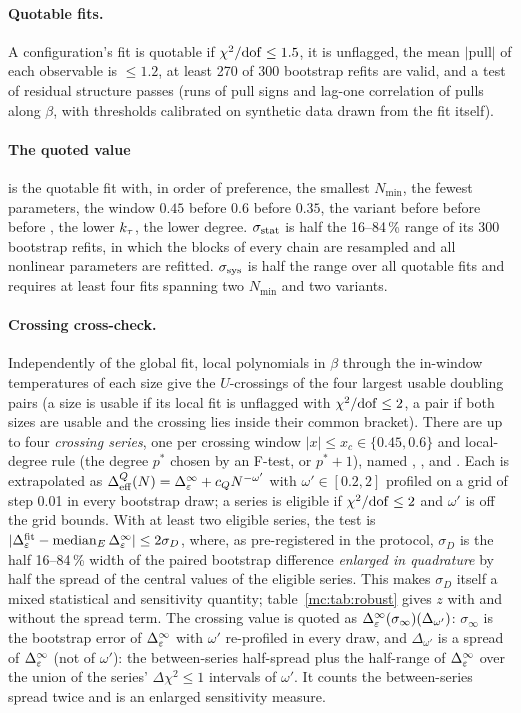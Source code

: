 \paragraph{Quotable fits.} A configuration's fit is quotable if $\chi^2/{\rm dof}\le1.5$, it is unflagged, the mean $|$pull$|$ of each observable is
$\le1.2$, at least 270 of 300 bootstrap refits are valid, and a test of residual structure passes (runs of pull signs and lag-one correlation
of pulls along $\beta$, with thresholds calibrated on synthetic data drawn from the fit itself).

\paragraph{The quoted value} is the quotable fit with, in order of preference, the smallest $N_{\min}$, the fewest parameters, the window
$0.45$ before $0.6$ before $0.35$, the variant  before  before  before , the lower $k_\tau$,
the lower degree. $\sigma_{\rm stat}$ is half the 16--84\,\% range of its 300 bootstrap refits, in which the blocks of every chain are resampled and all nonlinear
parameters are refitted. $\sigma_{\rm sys}$ is
half the range over all quotable fits and requires at least four fits spanning two $N_{\min}$ and two variants.

\paragraph{Crossing cross-check.} Independently of the global fit, local polynomials in $\beta$ through the in-window temperatures of each size
give the $U$-crossings of the four largest usable doubling pairs (a size is usable if its local fit is unflagged with $\chi^2/{\rm dof}\le2$,
a pair if both sizes are usable and the crossing lies inside their common bracket). There are up to four \emph{crossing series}, one per
crossing window $|x|\le x_c\in\{0.45,0.6\}$ and local-degree rule (the degree $p^*$ chosen by an F-test, or $p^*+1$), named
, ,  and . Each is extrapolated as $\Delta_{\rm eff}^Q(N)=\Delta_\varepsilon^\infty+c_QN^{-\omega'}$ with $\omega'\in[0.2,2]$ profiled on a grid of step 0.01 in every
bootstrap draw; a series is eligible if $\chi^2/{\rm dof}\le2$ and $\omega'$ is off the grid bounds. With at least two eligible series, the test
is $|\Delta_\varepsilon^{\rm fit}-{\rm median}_E\,\Delta_\varepsilon^\infty|\le2\sigma_D$, where, as pre-registered in the protocol, $\sigma_D$ is the half 16--84\,\% width of
the paired bootstrap difference \emph{enlarged in quadrature} by half the spread of the central values of the eligible series. This makes
$\sigma_D$ itself a mixed statistical and sensitivity quantity; table~\ref{mc:tab:robust} gives $z$ with and without the spread term. The crossing
value is quoted as $\Delta_\varepsilon^\infty(\sigma_\infty)(\Delta_{\omega'})$: $\sigma_\infty$ is the bootstrap error of $\Delta_\varepsilon^\infty$ with $\omega'$
re-profiled in every draw, and $\Delta_{\omega'}$ is a spread of $\Delta_\varepsilon^\infty$ (not of $\omega'$): the between-series half-spread plus the
half-range of $\Delta_\varepsilon^\infty$ over the union of the series' $\Delta\chi^2\le1$ intervals of $\omega'$. It counts the between-series spread twice
and is an enlarged sensitivity measure.

